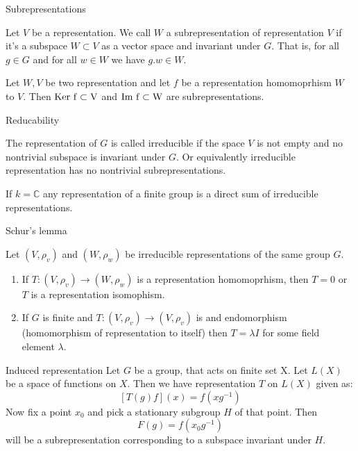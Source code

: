 \documentclass{beamer}
\def\ker{\rm Ker\ }
\def\im{\rm Im}
\begin{document}
\begin{frame}{Subrepresentations}
    \begin{definition}
        Let $V$ be a representation. We call $W$ a subrepresentation of representation $V$ if it's a subspace $W\subset V$ as a vector space and invariant under $G$. That is, for all $g \in G$ and for all $w \in W$ we have $g.w \in W$.
    \end{definition}

    \begin{lemma}
        Let $W, V$ be two representation and let $f$ be a representation homomoprhism $W$ to $V$. Then $\ker f \subset V$ and $\im \ f \subset W$ are subrepresentations.
    \end{lemma}

\end{frame}

\begin{frame}{Reducability}
    \begin{definition}
        The representation of $G$ is called irreducible if the space $V$ is not empty and no nontrivial subspace is invariant under $G$. Or equivalently irreducible representation has no nontrivial subrepresentations.
    \end{definition}
    \begin{lemma}
        If $k = \mathbb{C}$ any representation of a finite group is a direct sum of irreducible representations.
    \end{lemma}
\end{frame}

\begin{frame}{Schur's lemma}
    \begin{lemma}
        Let $(V, \rho_v)$ and $(W, \rho_w)$ be irreducible representations of the same group $G$.
        \begin{enumerate}
            \item If $T: (V, \rho_v) \to (W, \rho_w)$ is a   representation homomoprhism, then $T=0$ or $T$ is a representation isomophism.
            \item If $G$ is finite and $T : (V, \rho_v) \to (V, \rho_v) $ is and endomorphism (homomorphism of representation to itself) then $T = \lambda I$ for some field element $\lambda$.
        \end{enumerate}
    \end{lemma}

\end{frame}

\begin{frame}{Induced representation}
    Let $G$ be a group, that acts on finite set X. Let $L(X)$ be a space of functions on $X$. Then we have representation $T$ on $L(X)$ given as:
    $$\left[T(g) f\right] (x) = f (x g^{-1}) $$
    Now fix a point $x_0$ and pick a stationary subgroup $H$ of that point. Then
    $$ F(g) = f(x_0 g^{-1}) $$
    will be a subrepresentation corresponding to a subspace invariant under $H$.
\end{frame}
\end{document}
